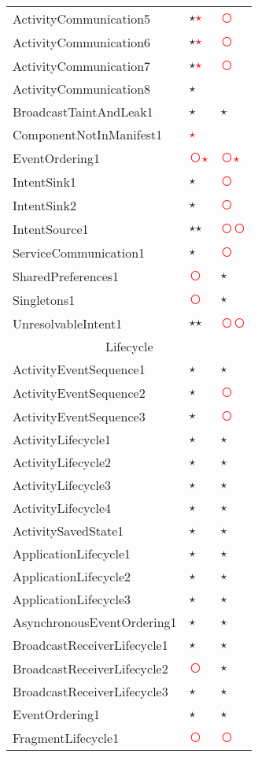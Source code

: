 \documentclass[../draft.tex]{subfiles}
\newcommand{\fp}{\textcolor{white}{\textcircled{\textcolor{red}{$\star$}}}}
\newcommand{\fn}{\textcolor{red}{\textcircled{ }}}
\newcommand{\tp}[0]{\textcircled{$\star$}}
\newcommand{\tsub}[1]{\multicolumn{3}{c}{#1}\\\hline}
\begin{document}
\begin{longtable}{l | l | l}
        ActivityCommunication5 & \tp \fp & \fn\\
        ActivityCommunication6 & \tp \fp & \fn\\
        ActivityCommunication7 & \tp \fp & \fn\\
        ActivityCommunication8 & \tp & \\
        BroadcastTaintAndLeak1 & \tp & \tp\\
        ComponentNotInManifest1 & \fp & \\
        EventOrdering1 & \fn \fp & \fn \fp\\
        IntentSink1 & \tp & \fn\\
        IntentSink2 & \tp & \fn\\
        IntentSource1 & \tp \tp & \fn \fn\\ 
        ServiceCommunication1 & \tp & \fn\\
        SharedPreferences1 & \fn & \tp\\
        Singletons1 & \fn & \tp\\
        UnresolvableIntent1 & \tp \tp & \fn \fn\\
        \hline
        \tsub{Lifecycle}
        ActivityEventSequence1 & \tp & \tp\\
        ActivityEventSequence2 & \tp & \fn\\
        ActivityEventSequence3 & \tp & \fn\\
        ActivityLifecycle1 & \tp & \tp\\
        ActivityLifecycle2 & \tp & \tp\\
        ActivityLifecycle3 & \tp & \tp\\
        ActivityLifecycle4 & \tp & \tp\\
        ActivitySavedState1 & \tp & \tp\\
        ApplicationLifecycle1 & \tp & \tp\\
        ApplicationLifecycle2 & \tp & \tp\\
        ApplicationLifecycle3 & \tp & \tp\\
        AsynchronousEventOrdering1 & \tp & \tp\\
        BroadcastReceiverLifecycle1 & \tp & \tp\\
        BroadcastReceiverLifecycle2 & \fn & \tp\\
        BroadcastReceiverLifecycle3 & \tp & \tp\\
        EventOrdering1 & \tp & \tp\\
        FragmentLifecycle1 & \fn & \fn\\

\end{longtable}
\end{document}
